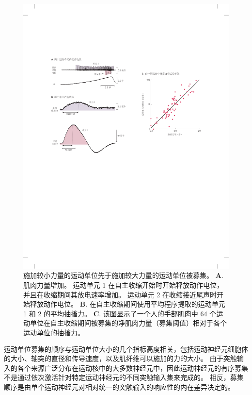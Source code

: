 \begin{figure}[htbp]
	\centering
	\includegraphics[width=1.0\linewidth]{chap31/fig_31_5}
	\caption{施加较小力量的运动单位先于施加较大力量的运动单位被募集\cite{desmedt1977ballistic,milner1973orderly}。
	\textbf{A}. 肌肉力量增加。
	运动单元 1 在自主收缩开始时开始释放动作电位，并且在收缩期间其放电速率增加。
	运动单元 2 在收缩接近尾声时开始释放动作电位。
	\textbf{B}. 在自主收缩期间使用平均程序提取的运动单元 1 和 2 的平均抽搐力。
	\textbf{C}. 该图显示了一个人的手部肌肉中 64 个运动单位在自主收缩期间被募集的净肌肉力量（募集阈值）相对于各个运动单位的抽搐力。}
	\label{fig:31_5}
\end{figure}


运动单位募集的顺序与运动单位大小的几个指标高度相关，包括运动神经元细胞体的大小、轴突的直径和传导速度，以及肌纤维可以施加的力的大小。
由于突触输入的各个来源广泛分布在运动核中的大多数神经元中，因此运动神经元的有序募集不是通过依次激活针对特定运动神经元的不同突触输入集来完成的。
相反，募集顺序是由单个运动神经元对相对统一的突触输入的响应性的内在差异决定的。


